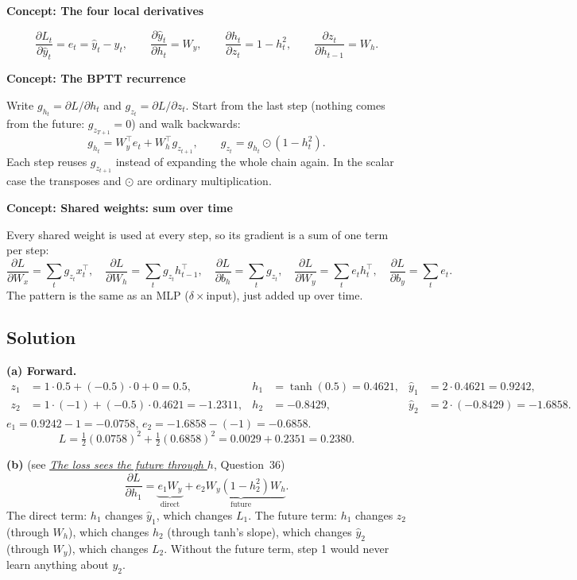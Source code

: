 \documentclass[12pt,a4paper]{article}
\newcommand{\concept}[2]{\par\medskip\phantomsection\label{#1}{\large\bfseries\color{blue!50!black} Concept: #2}\par}
\newcommand{\seeconcept}[3]{(see \hyperref[#1]{\textit{#2}}, Question~#3)}
\begin{document}
\concept{c:bpttlocal}{The four local derivatives}
\[
\frac{\partial L_t}{\partial\hat y_t}=e_t=\hat y_t-y_t,\qquad \frac{\partial\hat y_t}{\partial h_t}=W_y,\qquad \frac{\partial h_t}{\partial z_t}=1-h_t^2,\qquad \frac{\partial z_t}{\partial h_{t-1}}=W_h .
\]

\concept{c:bpttrec}{The BPTT recurrence}
Write $g_{h_t}=\partial L/\partial h_t$ and $g_{z_t}=\partial L/\partial z_t$. Start from the last step (nothing comes from the future: $g_{z_{T+1}}=0$) and walk backwards:
\[
g_{h_t}=W_y^\top e_t+W_h^\top g_{z_{t+1}},\qquad g_{z_t}=g_{h_t}\odot(1-h_t^2).
\]
Each step reuses $g_{z_{t+1}}$ instead of expanding the whole chain again. In the scalar case the transposes and $\odot$ are ordinary multiplication.

\concept{c:bpttweights}{Shared weights: sum over time}
Every shared weight is used at every step, so its gradient is a sum of one term per step:
\[
\frac{\partial L}{\partial W_x}=\sum_tg_{z_t}x_t^\top,\quad \frac{\partial L}{\partial W_h}=\sum_tg_{z_t}h_{t-1}^\top,\quad \frac{\partial L}{\partial b_h}=\sum_tg_{z_t},\quad \frac{\partial L}{\partial W_y}=\sum_te_th_t^\top,\quad \frac{\partial L}{\partial b_y}=\sum_te_t .
\]
The pattern is the same as an MLP ($\delta\times$input), just added up over time.

\subsection*{Solution}
\textbf{(a) Forward.}
\begin{align*}
z_1&=1\cdot0.5+(-0.5)\cdot0+0=0.5, & h_1&=\tanh(0.5)=0.4621, & \hat y_1&=2\cdot0.4621=0.9242,\\
z_2&=1\cdot(-1)+(-0.5)\cdot0.4621=-1.2311, & h_2&=-0.8429, & \hat y_2&=2\cdot(-0.8429)=-1.6858.
\end{align*}
$e_1=0.9242-1=-0.0758$, $e_2=-1.6858-(-1)=-0.6858$.
\[
L=\tfrac12(0.0758)^2+\tfrac12(0.6858)^2=0.0029+0.2351=0.2380 .
\]

\textbf{(b)} \seeconcept{c:bpttpaths}{The loss sees the future through $h$}{36}
\[
\frac{\partial L}{\partial h_1}=\underbrace{e_1W_y}_{\text{direct}}+\underbrace{e_2W_y(1-h_2^2)W_h}_{\text{future}}.
\]
The direct term: $h_1$ changes $\hat y_1$, which changes $L_1$. The future term: $h_1$ changes $z_2$ (through $W_h$), which changes $h_2$ (through tanh's slope), which changes $\hat y_2$ (through $W_y$), which changes $L_2$. Without the future term, step 1 would never learn anything about $y_2$.
\end{document}
